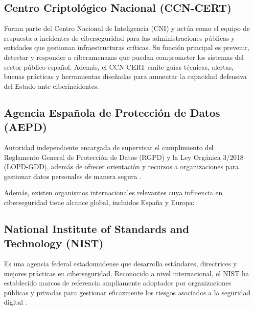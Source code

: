 \documentclass[a4paper, 10pt]{article}
\begin{document}
\subsection*{Centro Criptológico Nacional (CCN-CERT)}

Forma parte del Centro Nacional de Inteligencia (CNI) y actúa como el equipo de respuesta a incidentes de ciberseguridad para las administraciones públicas y entidades que gestionan infraestructuras críticas. Su función principal es prevenir, detectar y responder a ciberamenazas que puedan comprometer los sistemas del sector público español. Además, el CCN-CERT emite guías técnicas, alertas, buenas prácticas y herramientas diseñadas para aumentar la capacidad defensiva del Estado ante ciberincidentes. \cite{ccncert}



\par\vspace{0.5cm}

\subsection*{Agencia Española de Protección de Datos (AEPD)}

Autoridad independiente encargada de supervisar el cumplimiento del Reglamento General de Protección de Datos (RGPD) y la Ley Orgánica 3/2018 (LOPD-GDD), además de ofrecer orientación y recursos a organizaciones para gestionar datos personales de manera segura \cite{aepd}.
\par\vspace{0.5cm}

Además, existen organismos internacionales relevantes cuya influencia en ciberseguridad tiene alcance global, incluidos España y Europa:
\par\vspace{0.5cm}




\subsection*{National Institute of Standards and Technology (NIST)}

Es una agencia federal estadounidense que desarrolla estándares, directrices y mejores prácticas en ciberseguridad. Reconocido a nivel internacional, el NIST ha establecido marcos de referencia ampliamente adoptados por organizaciones públicas y privadas para gestionar eficazmente los riesgos asociados a la seguridad digital \cite{nist}.
\par\vspace{0.5cm}
\end{document}
